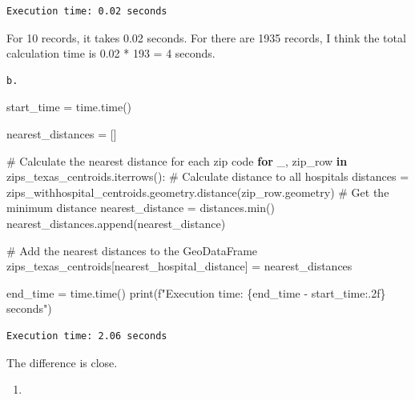 \documentclass[
  letterpaper,
  DIV=11,
  numbers=noendperiod]{scrartcl}
\newenvironment{Shaded}{\begin{snugshade}}{\end{snugshade}}
\newcommand{\BuiltInTok}[1]{\textcolor[rgb]{0.00,0.23,0.31}{#1}}
\newcommand{\CommentTok}[1]{\textcolor[rgb]{0.37,0.37,0.37}{#1}}
\newcommand{\ControlFlowTok}[1]{\textcolor[rgb]{0.00,0.23,0.31}{\textbf{#1}}}
\newcommand{\KeywordTok}[1]{\textcolor[rgb]{0.00,0.23,0.31}{\textbf{#1}}}
\newcommand{\NormalTok}[1]{\textcolor[rgb]{0.00,0.23,0.31}{#1}}
\newcommand{\OperatorTok}[1]{\textcolor[rgb]{0.37,0.37,0.37}{#1}}
\newcommand{\SpecialCharTok}[1]{\textcolor[rgb]{0.37,0.37,0.37}{#1}}
\newcommand{\SpecialStringTok}[1]{\textcolor[rgb]{0.13,0.47,0.30}{#1}}
\newcommand{\StringTok}[1]{\textcolor[rgb]{0.13,0.47,0.30}{#1}}
\providecommand{\tightlist}{%
  \setlength{\itemsep}{0pt}\setlength{\parskip}{0pt}}\usepackage{longtable,booktabs,array}
\begin{document}
\begin{verbatim}
Execution time: 0.02 seconds
\end{verbatim}

For 10 records, it takes 0.02 seconds. For there are 1935 records, I
think the total calculation time is 0.02 * 193 = 4 seconds.

\begin{verbatim}
b.
\end{verbatim}

\begin{Shaded}
\begin{Highlighting}[]
\NormalTok{start\_time }\OperatorTok{=}\NormalTok{ time.time()}

\NormalTok{nearest\_distances }\OperatorTok{=}\NormalTok{ []}

\CommentTok{\# Calculate the nearest distance for each zip code}
\ControlFlowTok{for}\NormalTok{ \_, zip\_row }\KeywordTok{in}\NormalTok{ zips\_texas\_centroids.iterrows():}
    \CommentTok{\# Calculate distance to all hospitals}
\NormalTok{    distances }\OperatorTok{=}\NormalTok{ zips\_withhospital\_centroids.geometry.distance(zip\_row.geometry)}
    \CommentTok{\# Get the minimum distance}
\NormalTok{    nearest\_distance }\OperatorTok{=}\NormalTok{ distances.}\BuiltInTok{min}\NormalTok{()}
\NormalTok{    nearest\_distances.append(nearest\_distance)}

\CommentTok{\# Add the nearest distances to the GeoDataFrame}
\NormalTok{zips\_texas\_centroids[}\StringTok{\textquotesingle{}nearest\_hospital\_distance\textquotesingle{}}\NormalTok{] }\OperatorTok{=}\NormalTok{ nearest\_distances}

\NormalTok{end\_time }\OperatorTok{=}\NormalTok{ time.time()}
\BuiltInTok{print}\NormalTok{(}\SpecialStringTok{f"Execution time: }\SpecialCharTok{\{}\NormalTok{end\_time }\OperatorTok{{-}}\NormalTok{ start\_time}\SpecialCharTok{:.2f\}}\SpecialStringTok{ seconds"}\NormalTok{)}
\end{Highlighting}
\end{Shaded}

\begin{verbatim}
Execution time: 2.06 seconds
\end{verbatim}

The difference is close.

\begin{enumerate}
\def\labelenumi{\alph{enumi}.}
\setcounter{enumi}{2}
\tightlist
\item
\end{enumerate}
\end{document}
